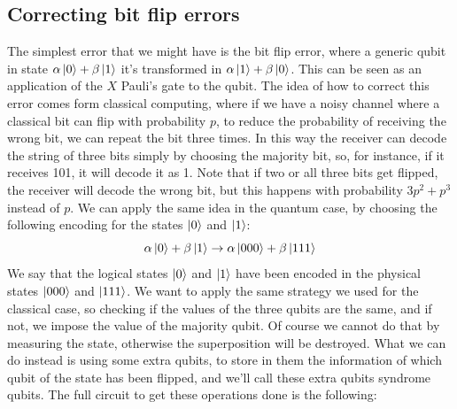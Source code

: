 \documentclass{article}
\begin{document}
	\subsection{Correcting bit flip errors}
	The simplest error that we might have is the bit flip error, where a generic qubit in state $\alpha\ket{0} + \beta\ket{1}$ it's transformed in $\alpha\ket{1} + \beta\ket{0}$. This can be seen as an application of the $X$ Pauli's gate to the qubit. The idea of how to correct this error comes form classical computing, where if we have a noisy channel where a classical bit can flip with probability $p$, to reduce the probability of receiving the wrong bit, we can repeat the bit three times. In this way the receiver can decode the string of three bits simply by choosing the majority bit, so, for instance, if it receives 101, it will decode it as 1. Note that if two or all three bits get flipped, the receiver will decode the wrong bit, but this happens with probability $3p^2 + p^3$ instead of $p$. We can apply the same idea in the quantum case, by choosing the following encoding for the states $\ket{0}$ and $\ket{1}$:
	\[ \alpha\ket{0} + \beta\ket{1} \rightarrow \alpha\ket{000} + \beta\ket{111}\]
	We say that the logical states $\ket{0}$ and $\ket{1}$ have been encoded in the physical states $\ket{000}$ and $\ket{111}$. We want to apply the same strategy we used for the classical case, so checking if the values of the three qubits are the same, and if not, we impose the value of the majority qubit. Of course we cannot do that by measuring the state, otherwise the superposition will be destroyed. What we can do instead is using some extra qubits, to store in them the information of which qubit of the state has been flipped, and we'll call these extra qubits syndrome qubits. The full circuit to get these operations done is the following:
\end{document}
